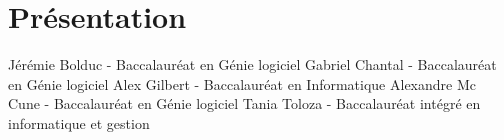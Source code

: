 \chapter{Présentation}
\label{s:presentation}


Jérémie Bolduc - Baccalauréat en Génie logiciel
Gabriel Chantal - Baccalauréat en Génie logiciel
Alex Gilbert - Baccalauréat en Informatique
Alexandre Mc Cune - Baccalauréat en Génie logiciel
Tania Toloza - Baccalauréat intégré en informatique et gestion